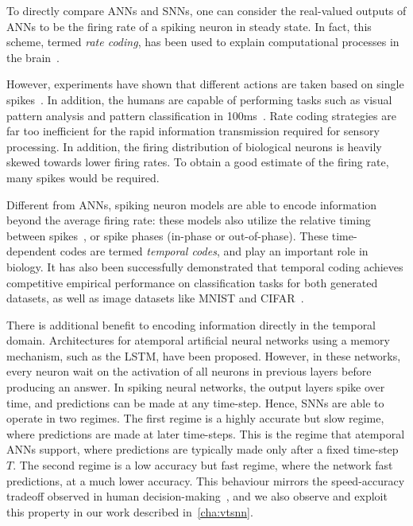 \documentclass[fyp]{socreport}
\begin{document}
To directly compare ANNs and SNNs, one can consider the real-valued outputs of
ANNs to be the firing rate of a spiking neuron in steady state. In fact, this
scheme, termed \emph{rate coding}, has been used to explain computational
processes in the brain~\cite{pfeiffer2018deep}.

However, experiments have shown that different actions are taken based on single
spikes~\cite{stemmler96_singl_spike_suffic}. In addition, the humans are capable
of performing tasks such as visual pattern analysis and pattern classification
in 100ms~\cite{thorpe2001spike}. Rate coding strategies are far too inefficient
for the rapid information transmission required for sensory processing. In
addition, the firing distribution of biological neurons is heavily skewed
towards lower firing rates. To obtain a good estimate of the firing rate, many
spikes would be required.

Different from ANNs, spiking neuron models are able to encode information beyond
the average firing rate: these models also utilize the relative timing between
spikes~\cite{guetig14_to_spike_or_when_to_spike}, or spike phases (in-phase or
out-of-phase). These time-dependent codes are termed \emph{temporal codes}, and
play an important role in biology. It has also been successfully demonstrated
that temporal coding achieves competitive empirical performance on
classification tasks for both generated datasets, as well as image datasets like
MNIST and CIFAR~\cite{comsa19_tempor_codin_spikin_neural_networ}.

There is additional benefit to encoding information directly in the temporal
domain. Architectures for atemporal artificial neural networks using a memory
mechanism, such as the LSTM, have been proposed. However, in these networks,
every neuron wait on the activation of all neurons in previous layers before
producing an answer. In spiking neural networks, the output layers spike over
time, and predictions can be made at any time-step. Hence, SNNs are able to
operate in two regimes. The first regime is a highly accurate but slow regime,
where predictions are made at later time-steps. This is the regime that
atemporal ANNs support, where predictions are typically made only after a fixed
time-step $T$. The second regime is a low accuracy but fast regime, where the
network fast predictions, at a much lower accuracy. This behaviour mirrors the
speed-accuracy tradeoff observed in human
decision-making~\cite{comsa19_tempor_codin_spikin_neural_networ}, and we also
observe and exploit this property in our work described in~\autoref{cha:vtsnn}.
\end{document}

